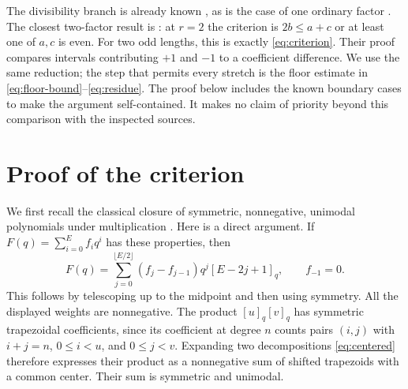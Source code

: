 \documentclass[11pt]{article}
\begin{document}
The divisibility branch is already known
\cite[Lemma~4.2 and Corollary~4.3]{CIMSY2026}, as is the case of one ordinary
factor \cite[Proposition~5.3]{CIMSY2026}. The closest two-factor result is
\cite[Proposition~4.5]{CIMSY2026}: at $r=2$ the criterion is $2b\le a+c$
or at least one of $a,c$ is even. For two odd lengths, this is exactly
\eqref{eq:criterion}. Their proof compares intervals contributing $+1$
and $-1$ to a coefficient difference. We use the same reduction; the step
that permits every stretch is the floor estimate in
\eqref{eq:floor-bound}--\eqref{eq:residue}. The proof below includes the
known boundary cases to make the argument self-contained. It makes no
claim of priority beyond this comparison with the inspected sources.

\section{Proof of the criterion}
We first recall the classical closure of symmetric, nonnegative, unimodal
polynomials under multiplication \cite{Andrews1975}. Here is a direct
argument. If $F(q)=\sum_{i=0}^E f_iq^i$ has these properties, then
\begin{equation}\label{eq:centered}
 F(q)=\sum_{j=0}^{\lfloor E/2\rfloor}
 (f_j-f_{j-1})q^j[E-2j+1]_q,\qquad f_{-1}=0.
\end{equation}
This follows by telescoping up to the midpoint and then using symmetry.
All the displayed weights are nonnegative. The product $[u]_q[v]_q$ has
symmetric trapezoidal coefficients, since its coefficient at degree $n$
counts pairs $(i,j)$ with $i+j=n$, $0\le i<u$, and $0\le j<v$.
Expanding two decompositions \eqref{eq:centered} therefore expresses their
product as a nonnegative sum of shifted trapezoids with a common center.
Their sum is symmetric and unimodal.
\end{document}
